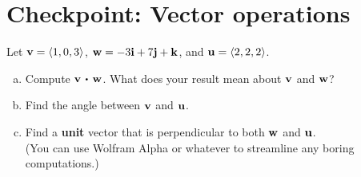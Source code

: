 


%


\allowdisplaybreaks
\section{Checkpoint: Vector operations }
Let $\mathbf{v} = \langle 1, 0, 3 \rangle $, $\mathbf{w} = -3\mathbf{i} + 7\mathbf{j} +\mathbf{k}$, and $\mathbf{u} = \langle 2,2,2 \rangle$.

\begin{enumerate}[(a)]
    \item Compute $\vv\dotp\vw$. What does your result mean about $\mathbf{v}$ and $\mathbf{w}$?
    \item Find the angle between $\mathbf{v}$ and $\mathbf{u}$.
    \item Find a \textbf{unit} vector that is perpendicular to both $\mathbf{w}$ and $\mathbf{u}$.\\ (You can use Wolfram Alpha or whatever to streamline any boring computations.)
\end{enumerate}
	
